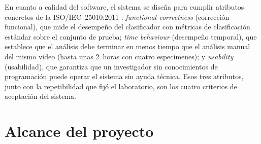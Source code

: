En cuanto a calidad del software, el sistema se diseña para cumplir atributos concretos
de la ISO/IEC~25010:2011 \cite{iso25010}: \textit{functional correctness} (corrección
funcional), que mide el desempeño del clasificador con métricas de clasificación
estándar sobre el conjunto de prueba; \textit{time behaviour} (desempeño temporal), que establece que el análisis
debe terminar en menos tiempo que el análisis manual del mismo video (hasta unas 2~horas con cuatro especímenes); y \textit{usability}
(usabilidad), que garantiza que un investigador sin conocimientos de programación puede
operar el sistema sin ayuda técnica. Esos tres atributos, junto con la repetibilidad que
fijó el laboratorio, son los cuatro criterios de aceptación del sistema.


\section{Alcance del proyecto}

